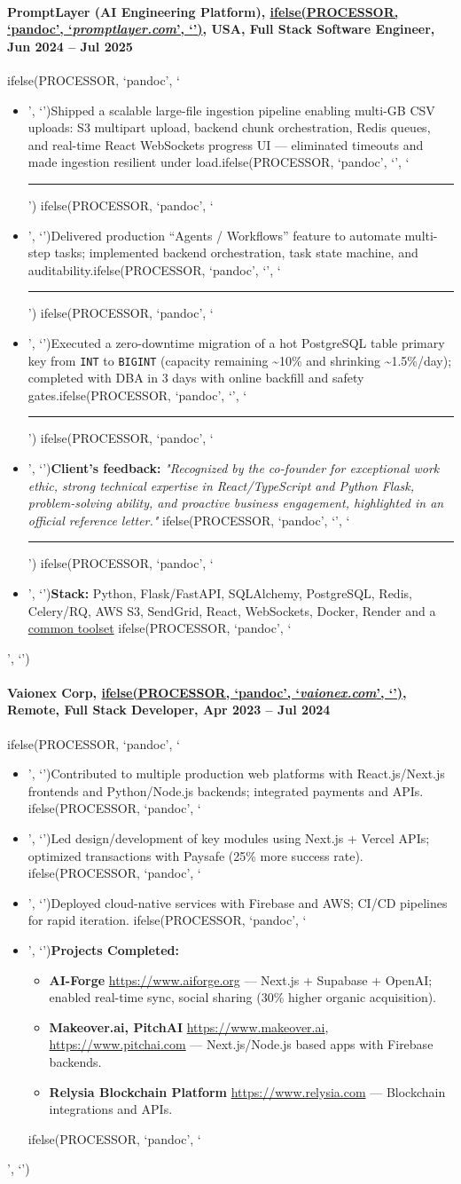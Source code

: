 \documentclass[a4paper,11pt]{article}
\newcommand{\chref}[2]{\href{#1}
{ifelse(PROCESSOR, `pandoc', `#2', `\underline{\smash{#2}}')}}
\newcommand{\itchref}[2]{\chref{#1}{\textit{#2}}}  %
\newcommand{\nesteditemize}[1]{%
    \vspace{2pt}%
    \begin{itemize}%
        \setlength{\itemsep}{2pt}%
        #1%
      \end{itemize}%
    }
\newcommand{\chrule}{ifelse(PROCESSOR, `pandoc', `', `\vspace{3pt}\hrule')}
\newcommand{\pdbeginitemize}{ifelse(PROCESSOR, `pandoc', `\begin{itemize}', `')}
\newcommand{\pditem}{ifelse(PROCESSOR, `pandoc', `\item', `')}
\newcommand{\pdenditemize}{ifelse(PROCESSOR, `pandoc', `\end{itemize}', `')}
\begin{document}
\paragraph*{PromptLayer (AI Engineering Platform), \itchref{https://promptlayer.com}{promptlayer.com}, USA, Full Stack Software Engineer, Jun 2024 -- Jul 2025}
\pdbeginitemize
\pditem Shipped a scalable large-file ingestion pipeline enabling multi-GB CSV uploads: S3 multipart upload, backend chunk orchestration, Redis queues, and real-time React WebSockets progress UI — eliminated timeouts and made ingestion resilient under load.\chrule
\pditem Delivered production “Agents / Workflows” feature to automate multi-step tasks; implemented backend orchestration, task state machine, and auditability.\chrule
\pditem Executed a zero-downtime migration of a hot PostgreSQL table primary key from \texttt{INT} to \texttt{BIGINT} (capacity remaining \textasciitilde10\% and shrinking \textasciitilde1.5\%/day); completed with DBA in 3 days with online backfill and safety gates.\chrule
\pditem \textbf{Client's feedback:} \textit{"Recognized by the co-founder for exceptional work ethic, strong technical expertise in React/TypeScript and Python Flask, problem-solving ability, and proactive business engagement, highlighted in an official reference letter."}
\chrule
\pditem \textbf{Stack:} Python, Flask/FastAPI, SQLAlchemy, PostgreSQL, Redis, Celery/RQ, AWS S3, SendGrid, React, WebSockets, Docker, Render and a \hyperlink{common-toolset}{common toolset}
\pdenditemize

\paragraph*{Vaionex Corp, \itchref{https://vaionex.com}{vaionex.com}, Remote, Full Stack Developer, Apr 2023 -- Jul 2024}
\pdbeginitemize
\pditem Contributed to multiple production web platforms with React.js/Next.js frontends and Python/Node.js backends; integrated payments and APIs.
\pditem Led design/development of key modules using Next.js + Vercel APIs; optimized transactions with Paysafe (25\% more success rate).
\pditem Deployed cloud-native services with Firebase and AWS; CI/CD pipelines for rapid iteration.
\pditem \textbf{Projects Completed:}
    \nesteditemize{
        \item \textbf{AI-Forge} \url{https://www.aiforge.org} — Next.js + Supabase + OpenAI; enabled real-time sync, social sharing (30\% higher organic acquisition).
        \item \textbf{Makeover.ai, PitchAI} \url{https://www.makeover.ai}, \url{https://www.pitchai.com} — Next.js/Node.js based apps with Firebase backends.
        \item \textbf{Relysia Blockchain Platform} \url{https://www.relysia.com} — Blockchain integrations and APIs.
    }
\pdenditemize
\end{document}
